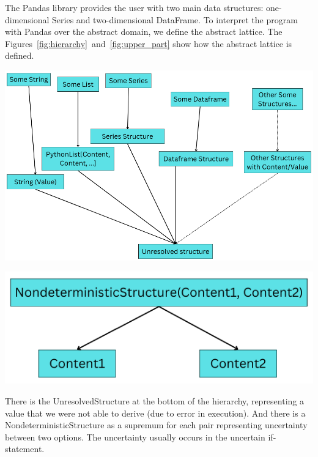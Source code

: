 \Large
The Pandas library provides the user with two main data structures: one-dimensional Series
and two-dimensional DataFrame.
To interpret the program with Pandas over the abstract domain, we define the abstract lattice.
The Figures~\ref{fig:hierarchy}~and~\ref{fig:upper_part} show how the abstract lattice is defined.

\begin{tikzfigure}
    \label{fig:hierarchy}
    \includegraphics[scale=0.7]{poster/img/hier}
\end{tikzfigure}

\begin{tikzfigure}
    \label{fig:upper_part}
    \includegraphics[scale=0.7]{poster/img/nondeterm}
\end{tikzfigure}

There is the UnresolvedStructure at the bottom of the hierarchy, representing a value that we were not
able to derive (due to error in execution).
And there is a NondeterministicStructure as a supremum for each pair representing uncertainty between two options.
The uncertainty usually occurs in the uncertain if-statement.

